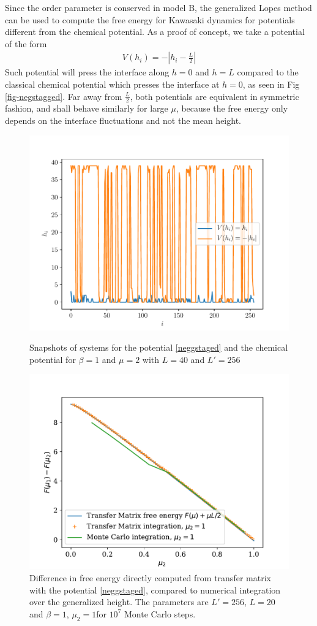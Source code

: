 {Since the order parameter is conserved in model B, the generalized Lopes method can be used to compute the free energy for Kawasaki dynamics for potentials different from the chemical potential. 
As a proof of concept, we take a potential of the form
\begin{align}
    V(h_i) = - |h_i-\frac{L}{2}|
    \label{neggstaged}
\end{align}
Such potential will press the interface along $h=0$ and $h=L$ compared to the classical chemical potential which presses the interface at $h=0$, as seen in Fig \ref{fig-negstagged}. Far away from $\frac{L}{2}$, both potentials are equivalent in symmetric fashion, and shall behave similarly for large $\mu$, because the free energy only depends on the interface fluctuations and not the mean height. 


\begin{figure}
    \centering
	\includegraphics[width=0.7\linewidth]{int-dyn/comp-potentiels-chimiques.pdf}
	\caption{Snapshots of systems for the potential \eqref{neggstaged} and the chemical potential for $\beta=1$ and $\mu=2$ with $L=40$ and $L'=256$}
    \label{fig-negstagged}	
    \centering
   	\includegraphics[width=0.7\linewidth]{int-dyn/integration-free-ene-negstagged.pdf}
    \caption{Difference in free energy directly computed from transfer matrix with the potential \eqref{neggstaged}, compared to numerical integration over the generalized height. The parameters are $L' = 256$, $L=20$ and $\beta=1$, $\mu_2 = 1$for $10^7$ Monte Carlo steps. } 
   	\label{fig-int-negstagged}    
\end{figure}  

}
